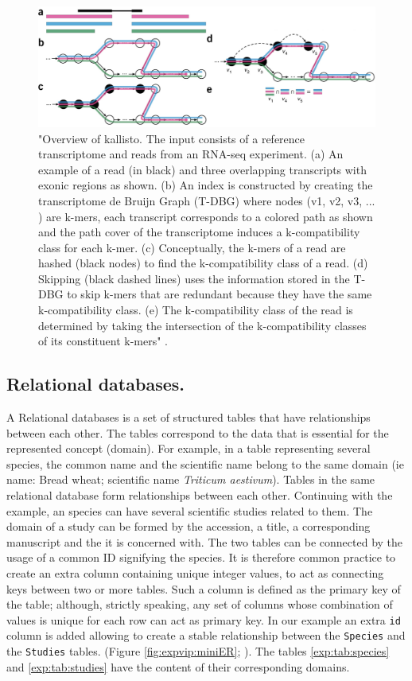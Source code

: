 \begin{figure}
\includegraphics[width=1\textwidth]{LitReview/Figures/kallisto.pdf}
\caption[Overview of kallisto.]{"Overview of kallisto. The input consists of a reference transcriptome and reads from an RNA-seq experiment. (a) An example of a read (in black) and three overlapping transcripts with exonic regions as shown. (b) An index is constructed by creating the transcriptome de Bruijn Graph (T-DBG) where
nodes (v1, v2, v3, ... ) are k-mers, each transcript corresponds to a colored path as shown and the path cover of the transcriptome induces a k-compatibility class for each k-mer. (c) Conceptually, the k-mers of a read are hashed (black nodes) to find the k-compatibility class of a read. (d) Skipping (black dashed lines) uses the information stored in the T-DBG to skip k-mers that are redundant because they have the same k-compatibility class. (e) The k-compatibility class of the read is determined by taking the intersection of the k-compatibility classes of its constituent k-mers" \citep{Bray2016}.}
\label{fig:exp:kallisto}
\end{figure}


\subsection{Relational databases.}
A Relational databases is a set of structured tables that have relationships between each other. 
The tables correspond to the data that is essential for the represented concept (domain).
For example, in a table representing several species, the common name and the scientific name belong to the same domain (ie name: Bread wheat; scientific name \textit{Triticum aestivum}). 
Tables in the same relational database form relationships between each other. 
Continuing with the example, an species can have several scientific studies related to them. 
The domain of a study can be formed by the accession, a title, a corresponding manuscript and the it is concerned with. The two tables can be connected by the usage of a common ID signifying the species. It is therefore common practice to create an extra column containing unique integer values, to act as connecting keys between two or more tables. Such a column is defined as the primary key of the table; although, strictly speaking, any set of columns whose combination of values is unique for each row can act as primary key. 
In our example an extra \texttt{id} column is added allowing to create a stable relationship between the \verb|Species| and the \verb|Studies| tables.
 (Figure \ref{fig:expvip:miniER}; \citealt{Codd1970}).
The tables \ref{exp:tab:species} and \ref{exp:tab:studies} have the content of their corresponding domains. 

